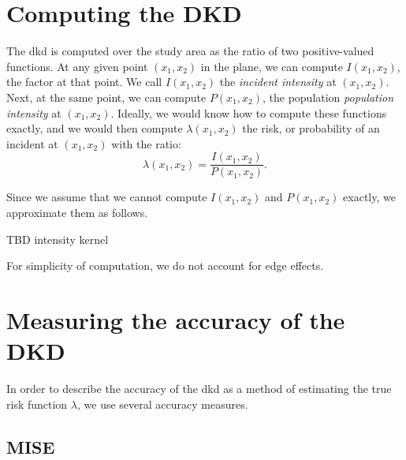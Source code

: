 \section{Computing the DKD}
\label{sec:method:computing}

The \gls{dkd} is computed over the study area as the ratio of two positive-valued functions.
At any given point \((x_1, x_2)\) in the plane, we can compute \(I(x_1, x_2)\), the \gls{factor} at that point.
We call \(I(x_1, x_2)\) the \textit{incident intensity} at \((x_1, x_2)\).
Next, at the same point, we can compute \(P(x_1, x_2)\), the population \textit{population intensity} at \((x_1, x_2)\).
Ideally, we would know how to compute these functions exactly, and we would then compute \(\lambda(x_1, x_2)\) the risk,
or probability of an incident at \((x_1, x_2)\) with the ratio:
\begin{equation}
    \lambda(x_1, x_2) = \frac{I(x_1, x_2)}{P(x_1, x_2)}.
\end{equation}

Since we assume that we cannot compute \(I(x_1, x_2)\) and \(P(x_1, x_2)\) exactly, we approximate them as follows.

TBD intensity kernel

For simplicity of computation, we do not account for edge effects.


\section{Measuring the accuracy of the DKD}
\label{sec:method:accuracy}

In order to describe the accuracy of the \gls{dkd} as a method of estimating the true risk function \(\lambda\),
we use several accuracy measures.

\subsection{MISE}
\label{subsec:method:mise}

